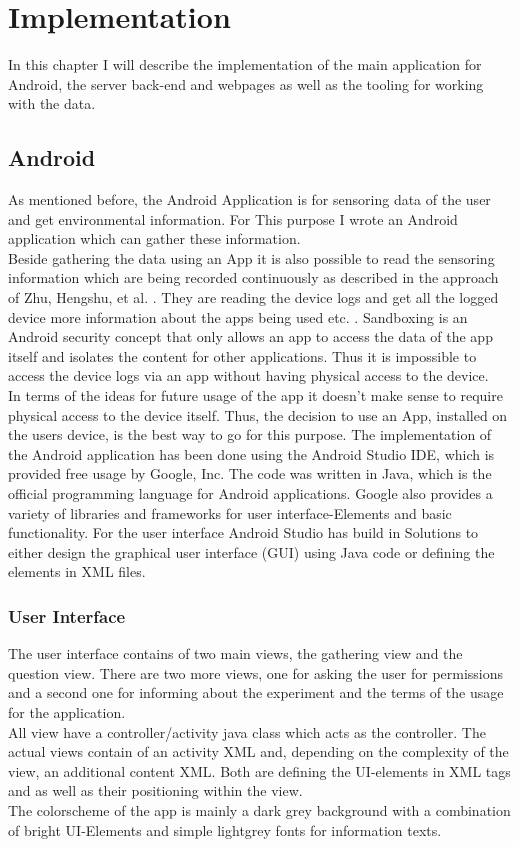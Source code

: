 \chapter{Implementation}

In this chapter I will describe the implementation of the main application for Android, the server back-end and webpages as well as the tooling for working with the data. 

\section{Android}
As mentioned before, the Android Application is for sensoring data of the user and get environmental information. For This purpose I wrote an Android application which can gather these information.\\ 
Beside gathering the data using an App it is also possible to read the sensoring information which are being recorded continuously as described in the approach of
Zhu, Hengshu, et al. \cite{zhu2015mining}. They are reading the device logs and get all the logged device more information about the apps being used etc. .
Sandboxing is an Android security concept that only allows an app to access the data of the app itself and isolates the content for other applications. Thus it is impossible to access the device logs via an app without having physical access to the device. \\
In terms of the ideas for future usage of the app it doesn't make sense to require physical access to the device itself. Thus, the decision to use an App, installed on the users device, is the best way to go for this purpose.
\bigbreak
The implementation of the Android application has been done using the Android Studio IDE, which is provided free usage by Google, Inc. The code was written in Java, which is the official programming language for Android applications. Google also provides a variety of libraries and frameworks for user interface-Elements and basic functionality. For the user interface Android Studio has build in Solutions to either design the graphical user interface (GUI) using Java code or defining the elements in XML files. 

\subsection{User Interface}
The user interface contains of two main views, the gathering view and the question view. There are two more views, one for asking the user for permissions and a second one for informing about the experiment and the terms of the usage for the application. \\
All view have a controller/activity java class which acts as the controller. The actual views contain of an activity XML and, depending on the complexity of the view, an additional content XML. Both are defining the UI-elements in XML tags and as well as their positioning within the view. \\
The colorscheme of the app is mainly a dark grey background with a combination of bright UI-Elements and simple lightgrey fonts for information texts.

